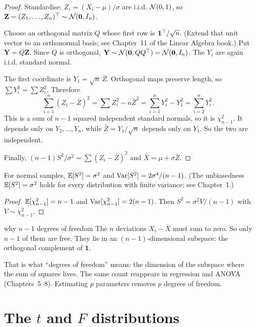 \begin{proof}
Standardise: $Z_i=(X_i-\mu)/\sigma$ are i.i.d. $\mathcal{N}(0,1)$, so $\mathbf{Z}=(Z_1,\dots,Z_n)^{\top}\sim\mathcal{N}(\mathbf{0},I_n)$.

Choose an orthogonal matrix $Q$ whose first row is $\mathbf{1}^{\top}/\sqrt n$. (Extend that unit vector to an orthonormal basis; see Chapter~11 of the Linear Algebra book.) Put $\mathbf{Y}=Q\mathbf{Z}$. Since $Q$ is orthogonal, $\mathbf{Y}\sim\mathcal{N}(\mathbf{0},QQ^{\top})=\mathcal{N}(\mathbf{0},I_n)$. The $Y_i$ are again i.i.d. standard normal.

The first coordinate is $Y_1=\sqrt n\,\bar{Z}$. Orthogonal maps preserve length, so $\sum Y_i^2=\sum Z_i^2$. Therefore
\[ \sum_{i=1}^n(Z_i-\bar{Z})^2=\sum Z_i^2-n\bar{Z}^2=\sum_{i=1}^nY_i^2-Y_1^2=\sum_{i=2}^nY_i^2. \]
This is a sum of $n-1$ squared independent standard normals, so it is $\chi^2_{n-1}$. It depends only on $Y_2,\dots,Y_n$, while $\bar{Z}=Y_1/\sqrt n$ depends only on $Y_1$. So the two are independent.

Finally, $(n-1)S^2/\sigma^2=\sum(Z_i-\bar{Z})^2$ and $\bar{X}=\mu+\sigma\bar{Z}$.
\end{proof}

\begin{corollary}\label{cor:s2}
For normal samples, $\mathbb{E}[S^2]=\sigma^2$ and $\operatorname{Var}[S^2]=2\sigma^4/(n-1)$. (The unbiasedness $\mathbb{E}[S^2]=\sigma^2$ holds for every distribution with finite variance; see Chapter~1.)
\end{corollary}

\begin{proof}
$\mathbb{E}[\chi^2_{n-1}]=n-1$ and $\operatorname{Var}[\chi^2_{n-1}]=2(n-1)$. Then $S^2=\sigma^2V/(n-1)$ with $V\sim\chi^2_{n-1}$.
\end{proof}

\begin{nuance}{why $n-1$ degrees of freedom}
The $n$ deviations $X_i-\bar{X}$ must sum to zero. So only $n-1$ of them are free. They lie in an $(n-1)$-dimensional subspace: the orthogonal complement of $\mathbf{1}$.

That is what ``degrees of freedom'' means: the dimension of the subspace where the sum of squares lives. The same count reappears in regression and ANOVA (Chapters~5--8). Estimating $p$ parameters removes $p$ degrees of freedom.
\end{nuance}

\section{The $t$ and $F$ distributions}

